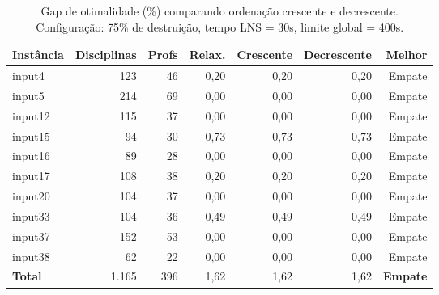 \begin{table}[htbp]
\centering
\caption{Gap de otimalidade (\%) comparando ordenação crescente e decrescente. Configuração: 75\% de destruição, tempo LNS = 30s, limite global = 400s.}
\label{tab:lns_order_gap}
\small
\begin{tabular}{@{}lrrrrrr@{}}
\toprule
\textbf{Instância} & \textbf{Disciplinas} & \textbf{Profs} & \textbf{Relax.} & \textbf{Crescente} & \textbf{Decrescente} & \textbf{Melhor} \\
\midrule
input4  & 123 & 46 & 0,20 & 0,20 & 0,20 & Empate \\
input5  & 214 & 69 & 0,00 & 0,00 & 0,00 & Empate \\
input12 & 115 & 37 & 0,00 & 0,00 & 0,00 & Empate \\
input15 & 94  & 30 & 0,73 & 0,73 & 0,73 & Empate \\
input16 & 89  & 28 & 0,00 & 0,00 & 0,00 & Empate \\
input17 & 108 & 38 & 0,20 & 0,20 & 0,20 & Empate \\
input20 & 104 & 37 & 0,00 & 0,00 & 0,00 & Empate \\
input33 & 104 & 36 & 0,49 & 0,49 & 0,49 & Empate \\
input37 & 152 & 53 & 0,00 & 0,00 & 0,00 & Empate \\
input38 & 62  & 22 & 0,00 & 0,00 & 0,00 & Empate \\
\midrule
\textbf{Total}  & 1.165 & 396 & 1,62 & 1,62 & 1,62 & \textbf{Empate} \\
\bottomrule
\end{tabular}
\end{table}

